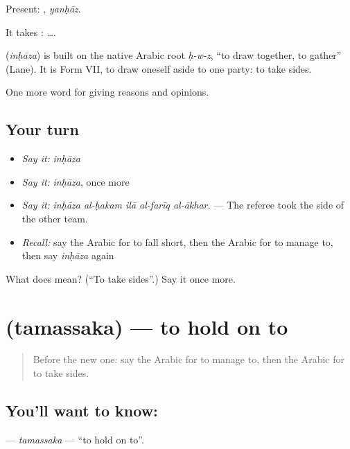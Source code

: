 Present: , \emph{yanḥāz}.

It takes :   ….

\begin{cousinweb}
\textbf{} (\emph{inḥāza}) is built on the native Arabic root \emph{ḥ-w-z}, \textquotedblleft{}to draw together, to gather\textquotedblright{} (Lane). It is Form VII, to draw oneself aside to one party: to take sides.
\end{cousinweb}

\begin{grammarlens}[title={What you've built}]
One more word for giving reasons and opinions.
\end{grammarlens}

\subsection*{Your turn}
\begin{itemize}
\raggedright
  \item \emph{Say it:} \emph{inḥāza}
  \item \emph{Say it:} \emph{inḥāza}, once more
  \item \emph{Say it:} \emph{inḥāza al-ḥakam ilā al-farīq al-ākhar.} — The referee took the side of the other team.
  \item \emph{Recall:} say the Arabic for to fall short, then the Arabic for to manage to, then say \emph{inḥāza} again
\end{itemize}

\begin{tcolorbox}[breakable,colback=teal!4,colframe=teal!35!black,title={Before you move on}]
What does  mean? (\textquotedblleft{}To take sides\textquotedblright{}.) Say it once more.
\end{tcolorbox}
\section[\texorpdfstring{\ar{تمسك} (tamassaka)}{تمسك (tamassaka)}]{ (tamassaka) — to hold on to}

\label{lesson:AR-C373-tamassaka}



\begin{quote}
Before the new one: say the Arabic for to manage to, then the Arabic for to take sides.
\end{quote}

\subsection*{You'll want to know: }
\textbf{} — \emph{tamassaka} — \textquotedblleft{}to hold on to\textquotedblright{}.

